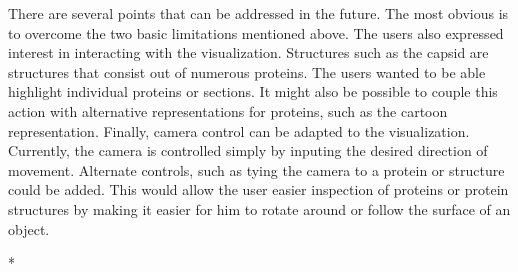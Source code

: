 \documentclass[review,journal]{vgtc}         %
\begin{document}
	There are several points that can be addressed in the future. The most obvious is to overcome the two basic limitations mentioned above. 
	The users also expressed interest in interacting with the visualization. 
	Structures such as the capsid are structures that consist out of numerous proteins. 
	The users wanted to be able highlight individual proteins or sections. 
	It might also be possible to couple this action with alternative representations for proteins, such as the cartoon representation.
	Finally, camera control can be adapted to the visualization. 
	Currently, the camera is controlled simply by inputing the desired direction of movement. 
	Alternate controls, such as tying the camera to a protein or structure could be added.
	This would allow the user easier inspection of proteins or protein structures by making it easier for him to rotate around or follow the surface of an object.
	
	
	
	
	
	{*}
	
\end{document}
